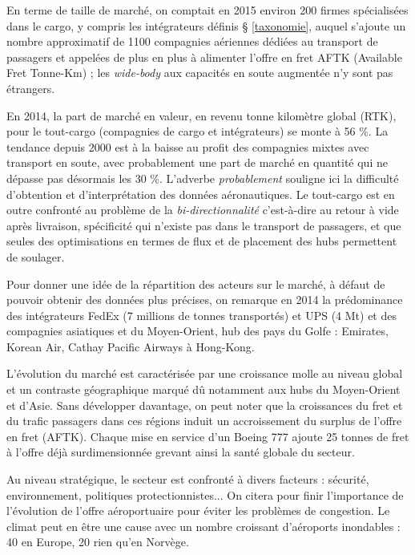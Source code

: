En terme de taille de marché, on comptait en 2015 environ 200 firmes spécialisées dans le cargo, y compris les intégrateurs définis § \ref{taxonomie}, auquel s'ajoute un nombre approximatif de 1100 compagnies aériennes dédiées au transport de passagers et appelées de plus en plus à alimenter l'offre en fret AFTK (Available Fret Tonne-Km) ; les \textit{wide-body} aux capacités en soute augmentée n'y sont pas étrangers.

En 2014, la part de marché en valeur, en revenu tonne kilomètre global (RTK), pour le tout-cargo (compagnies de cargo et intégrateurs) se monte à 56 \%. La tendance depuis 2000 est à la baisse au profit des compagnies mixtes avec transport en soute, avec probablement une part de marché en quantité qui ne dépasse pas désormais les 30 \%. L'adverbe \textit{probablement} souligne ici la difficulté d'obtention et d'interprétation des données aéronautiques. Le tout-cargo est en outre confronté au problème de la \textit{bi-directionnalité} c'est-à-dire au retour à vide après livraison, spécificité qui n'existe pas dans le transport de passagers, et que seules des optimisations en termes de flux et de placement des hubs permettent de soulager.

Pour donner une idée de la répartition des acteurs sur le marché, à défaut de pouvoir obtenir des données plus précises, on remarque en 2014 la prédominance des intégrateurs FedEx (7 millions de tonnes transportés) et UPS (4 Mt) et des compagnies asiatiques et du Moyen-Orient, hub des pays du Golfe : Emirates, Korean Air, Cathay Pacific Airways à Hong-Kong. \cite{top50}

L'évolution du marché est caractérisée par une croissance molle au niveau global et un contraste géographique marqué dû notamment aux hubs du Moyen-Orient et d'Asie. Sans développer davantage, on peut noter que la croissances du fret et du trafic passagers dans ces régions induit un accroissement du surplus de l'offre en fret (AFTK). Chaque mise en service d'un Boeing 777 ajoute 25 tonnes de fret 
à l'offre déjà surdimensionnée grevant ainsi la santé globale du secteur. \cite{theEconomist01}


Au niveau stratégique, le secteur est confronté à divers facteurs : sécurité, environnement, politiques protectionnistes... On citera pour finir l'importance
de l'évolution de l'offre aéroportuaire pour éviter les problèmes de congestion.
Le climat peut en être une cause avec un nombre croissant d'aéroports inondables : 40 en Europe, 20 rien qu'en Norvège.